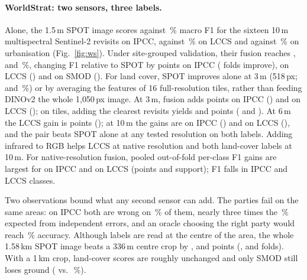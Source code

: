 \paragraph{WorldStrat: two sensors, three labels.}
Alone, the 1.5\,m SPOT image scores \wsIpccSpot{} against \wsIpccSms\,\% macro F1 for the sixteen 10\,m multispectral Sentinel-2 revisits on IPCC, \wsLccsSpot{} against \wsLccsSms\,\% on LCCS and \wsSmodSpot{} against \wsSmodSms\,\% on urbanisation (Fig.~\ref{fig:ws}). Under site-grouped validation, their fusion reaches \wsIpccFus, \wsLccsFus{} and \wsSmodFus\,\%, changing F1 relative to SPOT by \wgIpccA{} points on IPCC (\wgIpccAW{} folds improve), \wgLccsA{} on LCCS (\wgLccsAW) and \wgSmodA{} on SMOD (\wgSmodAW). For land cover, SPOT improves alone at 3\,m (518\,px; \wsIpccSpotThree{} and \wsLccsSpotThree\,\%) or by averaging the features of 16 full-resolution tiles, rather than feeding DINOv2 the whole 1{,}050\,px image. At 3\,m, fusion adds \wgIpccThree{} points on IPCC (\wgIpccThreeW) and \wgLccsThree{} on LCCS (\wgLccsThreeW); on tiles, adding the clearest revisits yields \wpIpccTilesFus{} and \wpLccsTilesFus{} points (\wpIpccTilesFusW{} and \wpLccsTilesFusW). At 6\,m the LCCS gain is \wgLccsSix{} points (\wgLccsSixW); at 10\,m the gains are \wgIpccTen{} on IPCC (\wgIpccTenW) and \wgLccsTen{} on LCCS (\wgLccsTenW), and the pair beats SPOT alone at any tested resolution on both labels. Adding infrared to RGB helps LCCS at native resolution and both land-cover labels at 10\,m. For native-resolution fusion, pooled out-of-fold per-class F1 gains are largest for \wcIpccTop{} on IPCC and \wcLccsTop{} on LCCS (points and support); F1 falls in \wcIpccNeg{} IPCC and \wcLccsNeg{} LCCS classes.

Two observations bound what any second sensor can add. The parties fail on the same areas: on IPCC both are wrong on \wfIpccBoth\,\% of them, nearly three times the \wfIpccIndep\,\% expected from independent errors, and an oracle choosing the right party would reach \wfIpccOracle\,\% accuracy. Although labels are read at the centre of the area, the whole 1.58\,km SPOT image beats a 336\,m centre crop by \wpIpccCentre, \wpLccsCentre{} and \wpSmodCentre{} points (\wpIpccCentreW, \wpLccsCentreW{} and \wpSmodCentreW{} folds). With a 1\,km crop, land-cover scores are roughly unchanged and only SMOD still loses ground (\wfSmodSpotCk{} vs.\ \wfSmodSpot\,\%).

